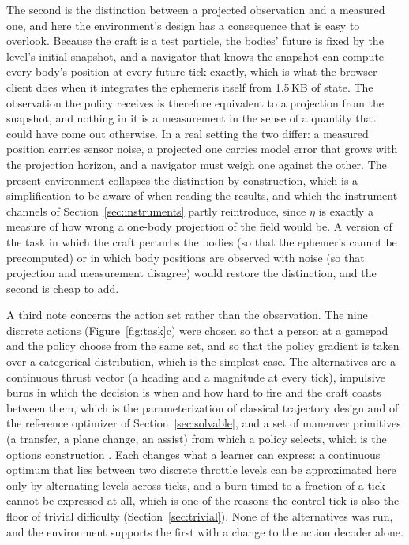 \documentclass[11pt]{article}
\begin{document}
The second is the distinction between a projected observation and a
measured one, and here the environment's design has a consequence that is
easy to overlook. Because the craft is a test particle, the bodies' future
is fixed by the level's initial snapshot, and a navigator that knows the
snapshot can compute every body's position at every future tick exactly,
which is what the browser client does when it integrates the ephemeris
itself from 1.5\,KB of state. The observation the policy receives is
therefore equivalent to a projection from the snapshot, and nothing in it
is a measurement in the sense of a quantity that could have come out
otherwise. In a real setting the two differ: a measured position carries
sensor noise, a projected one carries model error that grows with the
projection horizon, and a navigator must weigh one against the other. The
present environment collapses the distinction by construction, which is a
simplification to be aware of when reading the results, and which the
instrument channels of Section~\ref{sec:instruments} partly reintroduce,
since $\eta$ is exactly a measure of how wrong a one-body projection of the
field would be. A version of the task in which the craft perturbs the bodies
(so that the ephemeris cannot be precomputed) or in which body positions
are observed with noise (so that projection and measurement disagree) would
restore the distinction, and the second is cheap to add.

A third note concerns the action set rather than the observation. The nine
discrete actions (Figure~\ref{fig:task}c) were chosen so that a person at a
gamepad and the policy choose from the same set, and so that the policy
gradient is taken over a categorical distribution, which is the simplest
case. The alternatives are a continuous thrust vector (a heading and a
magnitude at every tick), impulsive burns in which the decision is when and
how hard to fire and the craft coasts between them, which is the
parameterization of classical trajectory design and of the reference
optimizer of Section~\ref{sec:solvable}, and a set of maneuver primitives
(a transfer, a plane change, an assist) from which a policy selects, which
is the options construction \cite{sutton1999}. Each changes what a learner
can express: a continuous optimum that lies between two discrete throttle
levels can be approximated here only by alternating levels across ticks,
and a burn timed to a fraction of a tick cannot be expressed at all, which
is one of the reasons the control tick is also the floor of trivial
difficulty (Section~\ref{sec:trivial}). None of the alternatives was run,
and the environment supports the first with a change to the action decoder
alone.







\end{document}
